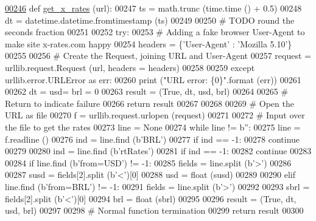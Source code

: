 \begin{DoxyCode}
\hypertarget{namespaceexch2exch.tex_l00246}{}\hyperlink{namespaceexch2exch_a928a1249a810cfd0ec5fca3ec8f764fb}{00246} \textcolor{keyword}{def }\hyperlink{namespaceexch2exch_a928a1249a810cfd0ec5fca3ec8f764fb}{get\_x\_rates} (url):
00247     ts = math.trunc (time.time () + 0.5)
00248     dt = datetime.datetime.fromtimestamp (ts)
00249     
00250     \textcolor{comment}{# TODO round the seconds fraction}
00251     
00252     \textcolor{keywordflow}{try}:
00253         \textcolor{comment}{# Adding a fake browser User-Agent to make site x-rates.com happy}
00254         headers = \{\textcolor{stringliteral}{'User-Agent'} : \textcolor{stringliteral}{'Mozilla 5.10'}\}
00255             
00256         \textcolor{comment}{# Create the Request, joining URL and User-Agent}
00257         request = urllib.request.Request (url, headers = headers)
00258         
00259     \textcolor{keywordflow}{except} urllib.error.URLError \textcolor{keyword}{as} err:
00260         \textcolor{keywordflow}{print} (\textcolor{stringliteral}{"URL error: \{0\}"}.format (err))
00261         
00262         dt = usd= brl = 0
00263         result = (\textcolor{keyword}{True}, dt, usd, brl)
00264         
00265         \textcolor{comment}{# Return to indicate failure}
00266         \textcolor{keywordflow}{return} result
00267 
00268         
00269     \textcolor{comment}{# Open the URL as file}
00270     f = urllib.request.urlopen (request)
00271     
00272     \textcolor{comment}{# Input over the file to get the rates}
00273     line = \textcolor{keywordtype}{None}
00274     \textcolor{keywordflow}{while} line != b\textcolor{stringliteral}{''}:
00275         line = f.readline ()
00276         ind = line.find (b\textcolor{stringliteral}{'BRL'})
00277         \textcolor{keywordflow}{if} ind == -1:
00278             \textcolor{keywordflow}{continue} 
00279         
00280         ind = line.find (b\textcolor{stringliteral}{'rtRates'})
00281         \textcolor{keywordflow}{if} ind == -1:
00282             \textcolor{keywordflow}{continue} 
00283                 
00284         \textcolor{keywordflow}{if} line.find (b\textcolor{stringliteral}{'from=USD'}) != -1:
00285             fields = line.split (b\textcolor{stringliteral}{'>'})
00286             
00287             susd = fields[2].split (b\textcolor{stringliteral}{'<'})[0]
00288             usd = float (susd)
00289         
00290         \textcolor{keywordflow}{elif} line.find (b\textcolor{stringliteral}{'from=BRL'}) != -1:
00291             fields = line.split (b\textcolor{stringliteral}{'>'})
00292             
00293             sbrl = fields[2].split (b\textcolor{stringliteral}{'<'})[0]
00294             brl = float (sbrl)
00295             
00296     result = (\textcolor{keyword}{True}, dt, usd, brl)
00297     
00298     \textcolor{comment}{# Normal function termination}
00299     \textcolor{keywordflow}{return} result
00300     
\end{DoxyCode}
